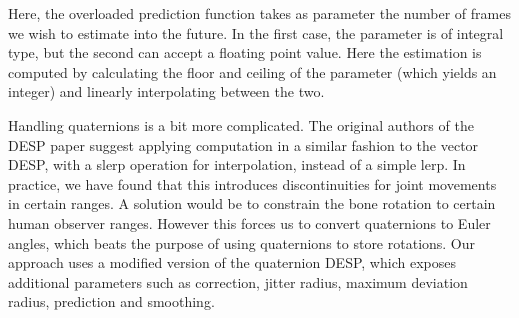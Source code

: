 \documentclass[a4paper, 12pt]{amsart}
\begin{document}
Here, the overloaded prediction function takes as parameter the number of frames we wish to estimate into the future. In the first case, the parameter is of integral type, but the second can accept a floating point value. Here the estimation is computed by calculating the floor and ceiling of the parameter (which yields an integer) and linearly interpolating between the two.

Handling quaternions is a bit more complicated. The original authors of the DESP paper \cite{bib_desp} suggest applying computation in a similar fashion to the vector DESP, with a slerp operation for interpolation, instead of a simple lerp. In practice, we have found that this introduces discontinuities for joint movements in certain ranges. A solution would be to constrain the bone rotation to certain human observer ranges. However this forces us to convert quaternions to Euler angles, which beats the purpose of using quaternions to store rotations. Our approach uses a modified version of the quaternion DESP, which exposes additional parameters such as correction, jitter radius, maximum deviation radius, prediction and smoothing.
\end{document}
